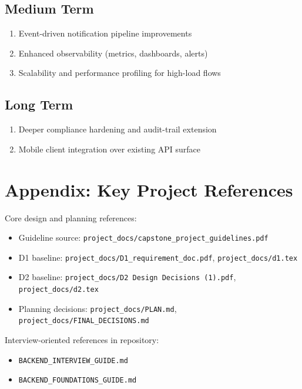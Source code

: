 \documentclass[12pt,a4paper]{article}
\begin{document}
\subsection*{Medium Term}
\begin{enumerate}
  \item Event-driven notification pipeline improvements
  \item Enhanced observability (metrics, dashboards, alerts)
  \item Scalability and performance profiling for high-load flows
\end{enumerate}

\subsection*{Long Term}
\begin{enumerate}
  \item Deeper compliance hardening and audit-trail extension
  \item Mobile client integration over existing API surface
\end{enumerate}

\section{Appendix: Key Project References}

Core design and planning references:
\begin{itemize}
  \item Guideline source: \texttt{project\_docs/capstone\_project\_guidelines.pdf}
  \item D1 baseline: \texttt{project\_docs/D1\_requirement\_doc.pdf}, \texttt{project\_docs/d1.tex}
  \item D2 baseline: \texttt{project\_docs/D2 Design Decisions (1).pdf}, \texttt{project\_docs/d2.tex}
  \item Planning decisions: \texttt{project\_docs/PLAN.md}, \texttt{project\_docs/FINAL\_DECISIONS.md}
\end{itemize}

Interview-oriented references in repository:
\begin{itemize}
  \item \texttt{BACKEND\_INTERVIEW\_GUIDE.md}
  \item \texttt{BACKEND\_FOUNDATIONS\_GUIDE.md}
\end{itemize}
\end{document}
